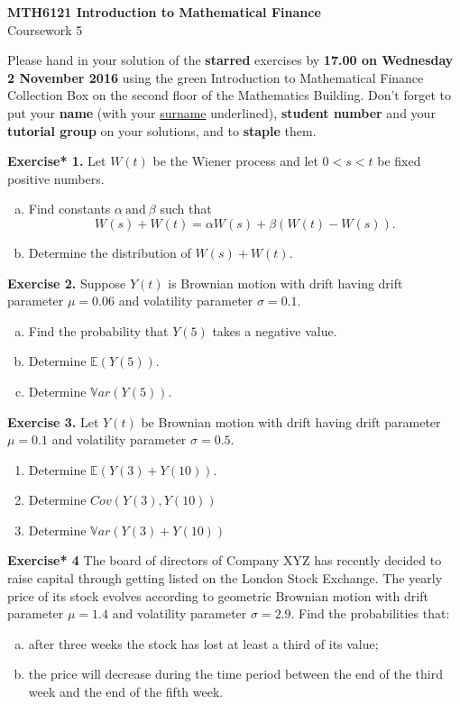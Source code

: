 \documentclass[11pt,a4paper]{report}
\begin{document}
    \begin{center}
	    \LARGE\textbf{MTH6121 Introduction to Mathematical Finance}\\
	    Coursework 5
    \end{center}
Please hand in your solution of the \textbf{starred} exercises by \textbf{17.00 on Wednesday 2 November 2016} using the green Introduction to Mathematical Finance Collection Box on the second floor of the Mathematics Building. Don’t forget to put your \textbf{name} (with your \underline{surname} underlined), \textbf{student number} and your \textbf{tutorial group} on your solutions, and to \textbf{staple} them.\par
\textbf{Exercise* 1.} Let $W(t)$ be the Wiener process and let $0 < s < t$ be fixed positive numbers.
\begin{enumerate}[(a)]
    \item  Find constants $\alpha \ \text{and}\ \beta$ such that
    $$W(s) + W(t) = \alpha W(s) + \beta (W(t)-W(s)).$$
    \item Determine the distribution of $W(s) + W(t).$
\end{enumerate}
%
\textbf{Exercise 2.} Suppose $Y(t)$ is Brownian motion with drift having drift parameter $\mu=0.06$ and volatility parameter $\sigma = 0.1$.
%
\begin{enumerate}[(a)]
    \item Find the probability that $Y(5)$ takes a negative value.
    \item Determine $\mathbb{E}(Y(5))$.
    \item Determine $\mathbb{V}ar(Y (5))$.
\end{enumerate}
%
\textbf{Exercise 3.}  Let $Y(t)$ be Brownian motion with drift having drift parameter $\mu = 0.1$ and volatility parameter $\sigma = 0.5$.
%
\begin{enumerate}
    \item Determine $\mathbb{E}(Y (3) + Y (10))$.
    \item Determine $Cov(Y (3), Y (10))$
    \item Determine $\mathbb{V}ar(Y (3) + Y (10))$
\end{enumerate}
%
\textbf{Exercise* 4} The board of directors of Company XYZ has recently decided to raise capital through getting listed on the London Stock Exchange. The yearly price of its stock evolves according to geometric Brownian motion with drift parameter $\mu = 1.4$ and volatility parameter $\sigma = 2.9$. Find the probabilities that:
%
\begin{enumerate}[(a)]
    \item after three weeks the stock has lost at least a third of its value;
    \item the price will decrease during the time period between the end of the third week and the end of the fifth week.
\end{enumerate}
\end{document}
